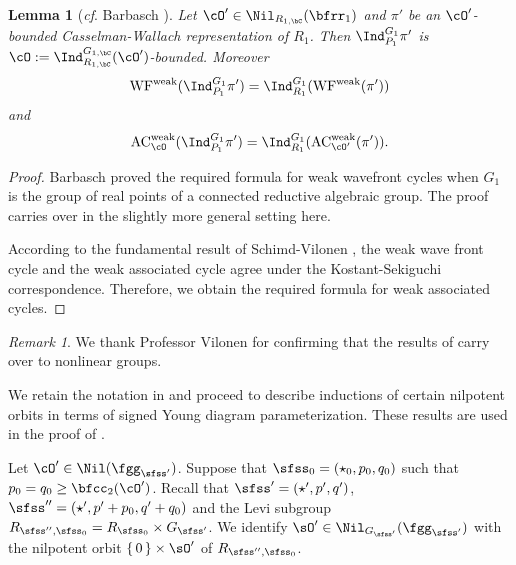 \documentclass[12pt,a4paper]{amsart}
\numberwithin{equation}{section}
\newtheorem{lem}[thm]{Lemma}
\theoremstyle{remark}
\newtheorem*{remark}{Remark}
\def\cOp{\cO^{\prime}}
\begin{document}
\begin{lem}[\emph{cf}. Barbasch {\cite[Corollary~5.0.10]{B.Orbit}}]
  \label{thm:Bar}
  Let $\cO'\in \Nil_{R_{1,\bC}}(\bfrr_1)$ and  $\pi'$ be an $\cO'$-bounded Casselman-Wallach
  representation of $R_1$. Then $\Ind^{G_1}_{P_1}\pi'$
  is $\cO:= \Indrgc(\cO')$-bounded. Moreover
\[
\WFw(\Ind^{G_1}_{P_1} \pi') = \Indrg (\WFw(\pi'))
\]
and
\[
\wAC_{\cO}(\Ind^{G_1}_{P_1} \pi') = \Indrg (\wAC_{\cO'}(\pi')).
\]
\end{lem}
\begin{proof}
Barbasch proved the required formula for weak wavefront cycles when $G_1$ is the group of
real points of a connected reductive algebraic group. The proof carries over in
the slightly more general setting here.

According to the fundamental result of Schimd-Vilonen \cite{SV}, the weak wave
front cycle and the weak associated cycle agree under the Kostant-Sekiguchi
correspondence. Therefore, we obtain the required formula for weak associated cycles.
\end{proof}

\begin{remark} We thank Professor Vilonen for confirming that the results of \cite{SV} carry over to nonlinear groups.
\end{remark}

\medskip
\def\Rsppo{R_{\sfss'',\sfss_0}}
\def\Rso{R_{\sfss_0}}

We retain the notation in  and proceed to describe inductions of
certain nilpotent orbits in terms of signed Young diagram
parameterization. These results are used in the proof of .

Let $\cOp\in \Nil(\fggsp)$.
Suppose that  $\sfss_0 = (\star_0, p_0,q_0)$ such that $p_0=q_0\geq
\bfcc_2(\cOp)$. Recall that $\sfss' = (\star',p',q')$, $\sfss''
=(\star',p'+p_0,q'+q_0)$ and the Levi subgroup $\Rsppo = \Rso\times \Gsp$. We
identify $\sOp\in \Nil_{\Gsp}(\fggsp)$ with the nilpotent orbit $\set{0}\times
\sOp$ of $\Rsppo$.


\def\po{a}
\def\qo{b}
\def\lll{p_0}
\end{document}
